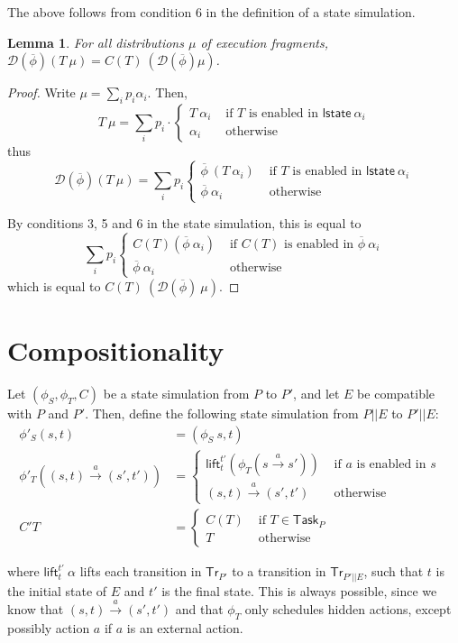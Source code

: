 \documentclass{article}
\newcommand{\Tr}{\mathsf{Tr}}
\newcommand{\Task}{\mathsf{Task}}
\newcommand{\lst}{\mathsf{lstate}}
\newcommand{\D}{\mathcal{D}}
\newtheorem{lemma}{Lemma}
\begin{document}
The above follows from condition 6 in the definition of a state simulation.

\begin{lemma}
    For all distributions $\mu$ of execution fragments, $\D(\overline{\phi})(T\ \mu) = C(T)\ (\D(\overline{\phi}) \mu)$.
\end{lemma}
\begin{proof}
    Write $\mu = \sum_i p_i \alpha_i$. Then, 
    \[T\ \mu = \sum_i p_i \cdot \begin{cases} T\ \alpha_i & \text{ if $T$ is enabled in $\lst\ \alpha_i$} \\
                                        \alpha_i & \text{ otherwise } \end{cases} \] 
    thus
    \[\D(\overline{\phi})(T\ \mu) = \sum_i p_i \begin{cases} \overline{\phi}\ (T\ \alpha_i) & \text{ if $T$ is enabled in $\lst\ \alpha_i$} \\
            \overline{\phi}\ \alpha_i & \text{ otherwise } \end{cases} \] 

    By conditions 3, 5 and 6 in the state simulation, this is equal to
    \[\sum_i p_i \begin{cases} C(T) (\overline{\phi}\ \alpha_i)  & \text{ if $C(T)$ is enabled in $\overline{\phi}\ \alpha_i$} \\
            \overline{\phi}\ \alpha_i & \text{ otherwise } \end{cases} \] 
    which is equal to $C(T)\ (\D(\overline{\phi})\ \mu)$.

\end{proof}

\section{Compositionality}
Let $(\phi_S, \phi_T, C)$ be a state simulation from $P$ to $P'$, and let $E$ be compatible with $P$ and $P'$. Then, define the following state simulation from $P || E$ to $P' || E$:
\begin{align*}
    \phi'_S (s,t) &= (\phi_S\ s, t) \\
    \phi'_T ((s,t) \xrightarrow{a} (s', t')) &=
        \begin{cases}
            \mathsf{lift}_t^{t'} (\phi_T (s \xrightarrow{a} s')) & \text{ if $a$ is enabled in $s$ } \\
            (s,t) \xrightarrow{a} (s', t') & \text{ otherwise } 
        \end{cases} \\
    C' T &= \begin{cases}
        C(T) & \text{ if $T \in \Task_P$ } \\
        T & \text{ otherwise }
    \end{cases}
\end{align*}

where $\mathsf{lift}_t^{t'}\ \alpha$ lifts each transition in $\Tr_{P'}$ to a transition in $\Tr_{P' || E}$, such that $t$ is the initial state of $E$ and $t'$ is the final state. This is always possible, since we know that $(s,t) \xrightarrow{a} (s', t')$ and that $\phi_T$ only schedules hidden actions, except possibly action $a$ if $a$ is an external action.
\end{document}
